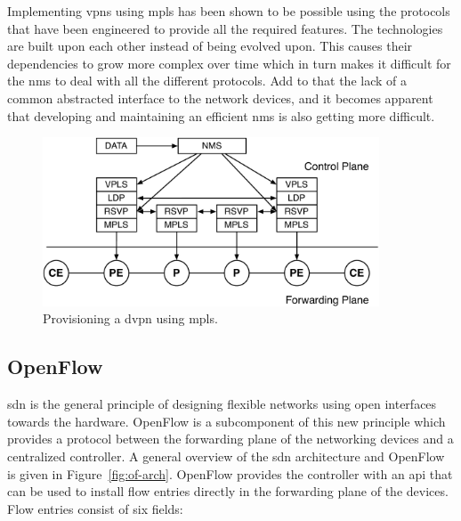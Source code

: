 Implementing \acp{vpn} using \ac{mpls} has been shown to be possible using the protocols that have been engineered to provide all the required features. The technologies are built upon each other instead of being evolved upon. This causes their dependencies to grow more complex over time which in turn makes it difficult for the \ac{nms} to deal with all the different protocols. Add to that the lack of a common abstracted interface to the network devices, and it becomes apparent that developing and maintaining an efficient \ac{nms} is also getting more difficult.

\begin{figure}[!h]
	\centering
	\includegraphics[width=10cm]{./includes/nms-stack.pdf}
	\caption{Provisioning a \ac{dvpn} using \ac{mpls}.}
	\label{fig:nms-stack}
\end{figure}


\subsection{OpenFlow} %
\label{sub:openflow}

\acl{sdn} is the general principle of designing flexible networks using open interfaces towards the hardware. OpenFlow is a subcomponent of this new principle which provides a protocol between the forwarding plane of the networking devices and a centralized controller. A general overview of the \ac{sdn} architecture and OpenFlow is given in Figure~\ref{fig:of-arch}. OpenFlow provides the controller with an \ac{api} that can be used to install flow entries directly in the forwarding plane of the devices. Flow entries consist of six fields:

